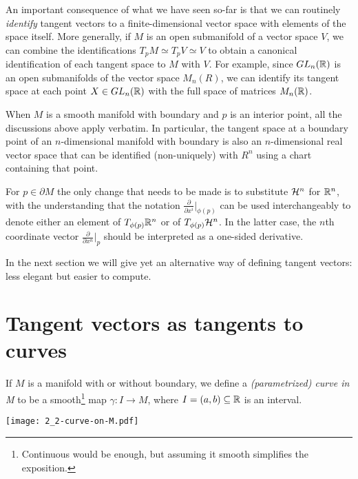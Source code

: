 An important consequence of what we have seen so-far is that we can routinely \emph{identify} tangent vectors to a finite-dimensional vector space with elements of the space itself.
More generally, if $M$ is an open submanifold of a vector space $V$, we can combine the identifications $T_p M \simeq T_p V \simeq V$ to obtain a canonical identification of each tangent space to $M$ with $V$.
For example, since $GL_n(\mathbb{R})$ is an open submanifolds of the vector space $M_n(R)$, we can identify its tangent space at each point $X\in GL_n(\mathbb{R})$ with the full space of matrices $M_n(\mathbb{R})$.

\begin{exe}
\end{exe}

\begin{rmk}
    When $M$ is a smooth manifold with boundary and $p$ is an interior point, all the discussions above apply verbatim. In particular, the tangent space at a boundary point of an $n$-dimensional manifold with boundary is also an $n$-dimensional real vector space that can be identified (non-uniquely) with $R^n$ using a chart containing that point.

    For $p\in\partial M$ the only change that needs to be made is to substitute $\mathcal{H}^n$ for $\mathbb{R}^n$, with the understanding that the notation $\frac{\partial}{\partial x^i}\big|_{\phi(p)}$ can be used interchangeably to denote either an element of $T_{\phi(p)}\mathbb{R}^n$ or of $T_{\phi(p)}\mathcal{H}^n$. In the latter case, the $n$th coordinate vector $\frac{\partial}{\partial x^n}\big|_{p}$ should be interpreted as a one-sided derivative.
\end{rmk}

In the next section we will give yet an alternative way of defining tangent vectors: less elegant but easier to compute.


\section{Tangent vectors as tangents to curves}

\begin{defn}
    If $M$ is a manifold with or without boundary, we define a \emph{(parametrized) curve in M} to be a smooth\footnote{Continuous would be enough, but assuming it smooth simplifies the exposition.} map $\gamma : I \to M$, where $I=(a,b)\subseteq\mathbb{R}$ is an interval.
\end{defn}
\begin{marginfigure}
    \texttt{[image: 2\_2-curve-on-M.pdf]}
\end{marginfigure}

